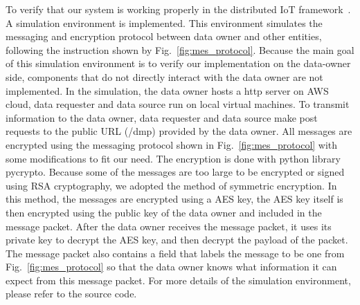 To verify that our system is working properly in the distributed IoT framework~\cite{campbell}. A simulation environment is implemented. This environment simulates the messaging and encryption protocol between data owner and other entities, following the instruction shown by Fig.~\ref{fig:mes_protocol}. Because the main goal of this simulation environment is to verify our implementation on the data-owner side, components that do not directly interact with the data owner are not implemented. 
In the simulation, the data owner hosts a http server on AWS cloud, data requester and data source run on local virtual machines. To transmit information to the data owner, data requester and data source make post requests to the public URL (/dmp) provided by the data owner. All messages are encrypted using the messaging protocol shown in Fig.~\ref{fig:mes_protocol} with some modifications to fit our need. The encryption is done with python library pycrypto. Because some of the messages are too large to be encrypted or signed using RSA cryptography, we adopted the method of symmetric encryption. In this method, the messages are encrypted using a AES key, the AES key itself is then encrypted using the public key of the data owner and included in the message packet. After the data owner receives the message packet, it uses its private key to decrypt the AES key, and then decrypt the payload of the packet. The message packet also contains a field that labels the message to be one from Fig.~\ref{fig:mes_protocol} so that the data owner knows what information it can expect from this message packet. For more details of the simulation environment, please refer to the source code.
